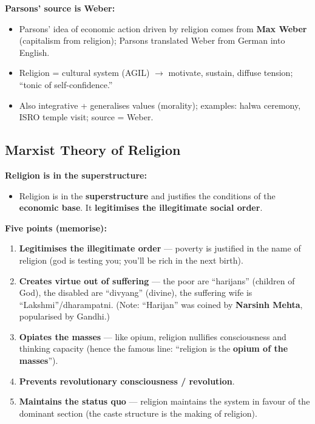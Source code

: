 \begin{CriticalPoint}
\textbf{Parsons' source is Weber:}
\begin{itemize}
\item Parsons' idea of economic action driven by religion comes from \textbf{Max Weber} (capitalism from religion); Parsons translated Weber from German into English.
\end{itemize}
\end{CriticalPoint}

\begin{QuickRevision}
\begin{itemize}
\item Religion = cultural system (AGIL) $\rightarrow$ motivate, sustain, diffuse tension; ``tonic of self-confidence.''
\item Also integrative + generalises values (morality); examples: halwa ceremony, ISRO temple visit; source = Weber.
\end{itemize}
\end{QuickRevision}

\sectiondivider

\subsection{Marxist Theory of Religion}

\begin{KeyConcept}
\textbf{Religion is in the superstructure:}
\begin{itemize}
\item Religion is in the \textbf{superstructure} and justifies the conditions of the \textbf{economic base}. It \textbf{legitimises the illegitimate social order}.
\end{itemize}
\end{KeyConcept}

\begin{ExampleBox}
\textbf{Five points (memorise):}
\begin{enumerate}
\item \textbf{Legitimises the illegitimate order} --- poverty is justified in the name of religion (god is testing you; you'll be rich in the next birth).
\item \textbf{Creates virtue out of suffering} --- the poor are ``harijans'' (children of God), the disabled are ``divyang'' (divine), the suffering wife is ``Lakshmi''/dharampatni. (Note: ``Harijan'' was coined by \textbf{Narsinh Mehta}, popularised by Gandhi.)
\item \textbf{Opiates the masses} --- like opium, religion nullifies consciousness and thinking capacity (hence the famous line: ``religion is the \textbf{opium of the masses}'').
\item \textbf{Prevents revolutionary consciousness / revolution}.
\item \textbf{Maintains the status quo} --- religion maintains the system in favour of the dominant section (the caste structure is the making of religion).
\end{enumerate}
\end{ExampleBox}

